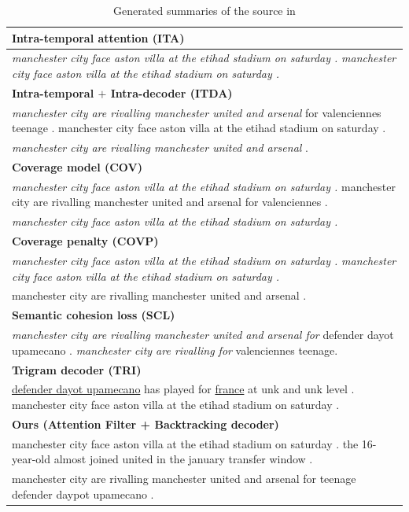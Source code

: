 \begin{table}[th!]
\scriptsize
\begin{center}
\caption{\label{tab:strong_methods} Generated summaries of the source in }
\begin{tabular}{|l|}%

\hline \bf Intra-temporal attention (ITA) \\
\hline \textit{manchester city face aston villa at the etihad stadium on saturday .} 
	   \textit{manchester city face aston villa at the etihad stadium on saturday .}\\
\hline \bf Intra-temporal $+$ Intra-decoder (ITDA) \\
\hline \textit{manchester city are rivalling manchester united and arsenal }for valenciennes
       teenage . manchester city face aston villa at the etihad stadium on saturday . \\
	   \textit{manchester city are rivalling manchester united and arsenal }. \\
\hline \bf Coverage model (COV) \\
\hline \textit{manchester city face aston villa at the etihad stadium on saturday .} 
       manchester city are rivalling manchester united and arsenal for valenciennes . \\
	   \textit{manchester city face aston villa at the etihad stadium on saturday .}\\
\hline \bf Coverage penalty (COVP)\\
\hline \textit{manchester city face aston villa at the etihad stadium on saturday .}
       \textit{manchester city face aston villa at the etihad stadium on saturday .}\\
	   manchester city are rivalling manchester united and arsenal .\\
\hline \bf Semantic cohesion loss (SCL) \\
\hline \textit{manchester city are rivalling manchester united and arsenal for } defender dayot upamecano . 
       \textit{manchester city are rivalling for} valenciennes teenage. \\
\hline \bf Trigram decoder (TRI) \\
\hline \underline{defender dayot upamecano} has played for \underline{france} at unk and unk level .
       manchester city face aston villa at the etihad stadium on saturday . \\
\hline \bf Ours (Attention Filter + Backtracking decoder) \\
\hline manchester city face aston villa at the etihad stadium on saturday . 
       the 16-year-old almost joined united in the january transfer window . \\
	   manchester city are rivalling manchester united and arsenal for teenage defender daypot upamecano .\\
\hline
\end{tabular}
\end{center}
\end{table}


